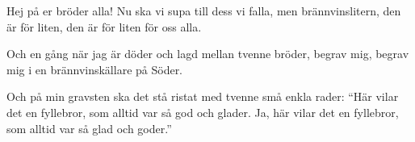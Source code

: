 \begin{song}

\begin{songmeta}
\end{songmeta}

\begin{songtext}
Hej på er bröder alla!
Nu ska vi supa till dess vi falla,
men brännvinslitern, den är för liten,
den är för liten för oss alla.

Och en gång när jag är döder
och lagd mellan tvenne bröder,
begrav mig, begrav mig
i en brännvinskällare på Söder.

Och på min gravsten ska det stå ristat
med tvenne små enkla rader:
\textquotedblleft{}Här vilar det en fyllebror,
som alltid var så god och glader.
Ja, här vilar det en fyllebror,
som alltid var så glad och goder.\textquotedblright{}
\end{songtext}
\end{song}
